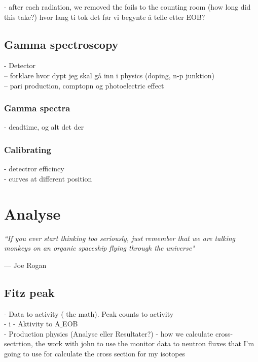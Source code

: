 \documentclass[twoside,english]{uiofysmaster/uiofysmaster}
\begin{document}
- after each radiation, we removed the foils to the counting room (how long did this take?) hvor lang ti tok det før vi begynte å telle etter EOB?

\section{Gamma spectroscopy}
\label{sec: gamma_spectro}

- Detector\\
-- forklare hvor dypt jeg skal gå inn i physics (doping, n-p junktion)\\
-- pari production, comptopn og photoelectric effect


\subsection{Gamma spectra}
\label{sec: gamma_spectra}

- deadtime, og alt det der

\subsection{Calibrating}
\label{sec: calibrating}

- detectror efficincy\\
- curves at different position



\chapter{Analyse}
\label{ch:analyse}

\epigraph{\itshape ``If you ever start thinking too seriously, just remember that we are talking monkeys on an organic spaceship flying through the universe"}{--- \textup{Joe Rogan}}



\section{Fitz peak}
\label{sec:fitz_peak}

- Data to activity ( the math). Peak counts to activity\\
- i - Aktivity to A$\_$EOB\\
- Production physics (Analyse eller Resultater?) - how we calculate cross-sectrtion, the work with john to use the monitor data to neutron fluxes that I’m going to use for calculate the cross section for my isotopes
\end{document}
